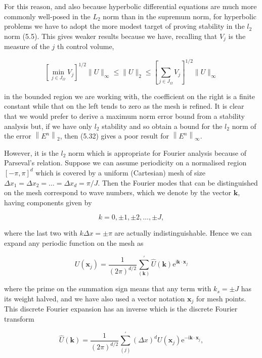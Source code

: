 \documentclass[10pt]{article}
\begin{document}
For this reason, and also because hyperbolic differential equations are much more commonly well-posed in the \(L_{2}\) norm than in the supremum norm, for hyperbolic problems we have to adopt the more modest target of proving stability in the \(l_{2}\) norm (5.5). This gives weaker results because we have, recalling that \(V_{j}\) is the measure of the \(j\) th control volume,

\[
\left[\min _{j \in J_{\Omega}} V_{j}\right]^{1 / 2}\|U\|_{\infty} \leq\|U\|_{2} \leq\left[\sum_{j \in J_{\Omega}} V_{j}\right]^{1 / 2}\|U\|_{\infty}
\]

in the bounded region we are working with, the coefficient on the right is a finite constant while that on the left tends to zero as the mesh is refined. It is clear that we would prefer to derive a maximum norm error bound from a stability analysis but, if we have only \(l_{2}\) stability and so obtain a bound for the \(l_{2}\) norm of the error \(\left\|E^{n}\right\|_{2}\), then (5.32) gives a poor result for \(\left\|E^{n}\right\|_{\infty}\).

However, it is the \(l_{2}\) norm which is appropriate for Fourier analysis because of Parseval's relation. Suppose we can assume periodicity on a normalised region \([-\pi, \pi]^{d}\) which is covered by a uniform (Cartesian) mesh of size \(\Delta x_{1}=\Delta x_{2}=\ldots=\Delta x_{d}=\pi / J\). Then the Fourier modes that can be distinguished on the mesh correspond to wave numbers, which we denote by the vector \(\mathbf{k}\), having components given by

\[
k=0, \pm 1, \pm 2, \ldots, \pm J,
\]

where the last two with \(k \Delta x= \pm \pi\) are actually indistinguishable. Hence we can expand any periodic function on the mesh as

\[
U\left(\mathbf{x}_{j}\right)=\frac{1}{(2 \pi)^{d / 2}} \sum_{(\mathbf{k})}^{\prime} \widehat{U}(\mathbf{k}) \mathrm{e}^{\mathrm{i} \mathbf{k} \cdot \mathbf{x}_{j}}
\]

where the prime on the summation sign means that any term with \(k_{s}= \pm J\) has its weight halved, and we have also used a vector notation \(\mathbf{x}_{j}\) for mesh points. This discrete Fourier expansion has an inverse which is the discrete Fourier transform

\[
\widehat{U}(\mathbf{k})=\frac{1}{(2 \pi)^{d / 2}} \sum_{(j)}^{\prime}(\Delta x)^{d} U\left(\mathbf{x}_{j}\right) \mathrm{e}^{-\mathrm{i} \mathbf{k} \cdot \mathbf{x}_{j}},
\]
\end{document}
